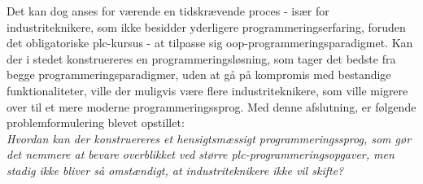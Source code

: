 Det kan dog anses for værende en tidskrævende proces - især for industriteknikere, som ikke besidder yderligere programmeringserfaring, foruden det obligatoriske \gls{plc}-kursus - at tilpasse sig \gls{oop}-programmeringsparadigmet\cite{dislikes_oop}. 
Kan der i stedet konstruereres en programmeringsløsning, som tager det bedste fra begge programmeringsparadigmer, uden at gå på kompromis med bestandige funktionaliteter, ville der muligvis være flere industriteknikere, som ville migrere over til et mere moderne programmeringssprog. Med denne afslutning, er følgende problemformulering blevet opstillet: \\

\noindent\textit{Hvordan kan der konstruereres et hensigtsmæssigt programmeringssprog, som gør det nemmere at bevare overblikket ved større \gls{plc}-programmeringsopgaver, men stadig ikke bliver så omstændigt, at industriteknikere ikke vil skifte?}